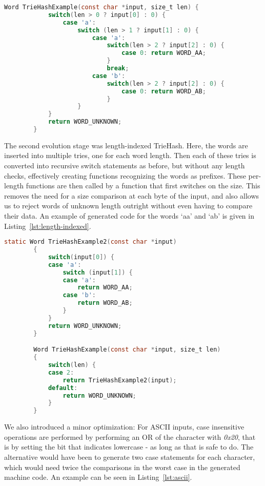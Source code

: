 \documentclass[parskip=half]{scrartcl}
\begin{document}
    \begin{lstlisting}[language=C,gobble=8,label=lst:initial,caption=Code generated by initial triehash version,frame=tb]
        Word TrieHashExample(const char *input, size_t len) {
            switch(len > 0 ? input[0] : 0) {
                case 'a':
                    switch (len > 1 ? input[1] : 0) {
                        case 'a':
                            switch(len > 2 ? input[2] : 0) {
                                case 0: return WORD_AA;
                            }
                            break;
                        case 'b':
                            switch(len > 2 ? input[2] : 0) {
                                case 0: return WORD_AB;
                            }
                    }
            }
            return WORD_UNKNOWN;
        }
    \end{lstlisting}

    The second evolution stage was length-indexed TrieHash. Here, the words
    are inserted into multiple tries, one for each word length. Then each of
    these tries is converted into recursive switch statements as before, but
    without any length checks, effectively creating functions recognizing the
    words as prefixes. These per-length functions are then called by a function
    that first switches on the size. This removes the need for a size comparison
    at each byte of the input, and also allows us to reject words of unknown
    length outright without even having to compare their data. An example of
    generated code for the words `aa' and `ab' is given in Listing~\ref{lst:length-indexed}.

    \begin{lstlisting}[language=C,gobble=8,label=lst:length-indexed,caption=Length-Indexed TrieHash,frame=tb]
        static Word TrieHashExample2(const char *input)
        {
            switch(input[0]) {
            case 'a':
                switch (input[1]) {
                case 'a':
                    return WORD_AA;
                case 'b':
                    return WORD_AB;
                }
            }
            return WORD_UNKNOWN;
        }

        Word TrieHashExample(const char *input, size_t len)
        {
            switch(len) {
            case 2:
                return TrieHashExample2(input);
            default:
                return WORD_UNKNOWN;
            }
        }
    \end{lstlisting}

    We also introduced a minor optimization: For ASCII inputs, case insensitive
    operations are performed by performing an OR of the character with \textit{0x20},
    that is by setting the bit that indicates lowercase - as long as that is
    safe to do. The alternative would have been to generate two case statements
    for each character, which would need twice the comparisons in the worst
    case in the generated machine code. An example can be seen in Listing~\ref{lst:ascii}.
\end{document}
